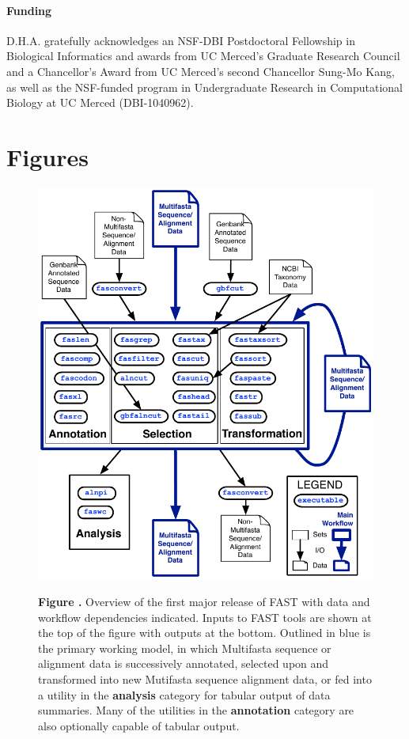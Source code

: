 \documentclass{frontiersSCNS} %
\begin{document}
\paragraph{Funding\textcolon} D.H.A. gratefully acknowledges an
NSF-DBI Postdoctoral Fellowship in Biological Informatics and awards
from UC Merced's Graduate Research Council and a Chancellor's Award
from UC Merced's second Chancellor Sung-Mo Kang, as well as the
NSF-funded program in Undergraduate Research in Computational
Biology at UC Merced (DBI-1040962).



\section*{Figures}

\begin{figure}
\begin{center}
\includegraphics[width=4.5in]{FAST_v8}%
\end{center}
\textbf{\label{fig:01} Figure
  .}{ Overview of the first major release of FAST with
  data and workflow dependencies indicated.  Inputs to FAST tools are
  shown at the top of the figure with outputs at the bottom.  Outlined
  in blue is the primary working model, in which Multifasta sequence
  or alignment data is successively annotated, selected upon and
  transformed into new Mutifasta sequence alignment data, or fed into
  a utility in the {\bf analysis} category for tabular output of data
  summaries. Many of the utilities in the {\bf annotation} category
  are also optionally capable of tabular output.}
\end{figure}
\end{document}
